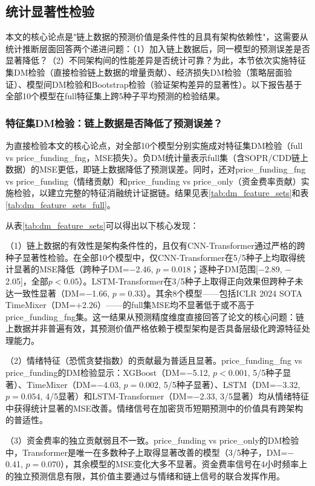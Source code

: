 \documentclass[12pt,a4paper]{ctexart}
\begin{document}
\subsection{统计显著性检验}

本文的核心论点是"链上数据的预测价值是条件性的且具有架构依赖性"，这需要从统计推断层面回答两个递进问题：（1）加入链上数据后，同一模型的预测误差是否显著降低？（2）不同架构间的性能差异是否统计可靠？为此，本节依次实施特征集DM检验（直接检验链上数据的增量贡献）、经济损失DM检验（策略层面验证）、模型间DM检验和Bootstrap检验（验证架构差异的显著性）。以下报告基于全部10个模型在full特征集上跨5种子平均预测的检验结果。

\subsubsection{特征集DM检验：链上数据是否降低了预测误差？}

为直接检验本文的核心论点，对全部10个模型分别实施成对特征集DM检验（full vs price\_funding\_fng，MSE损失）。负DM统计量表示full集（含SOPR/CDD链上数据）的MSE更低，即链上数据降低了预测误差。同时，还对price\_funding\_fng vs price\_funding（情绪贡献）和price\_funding vs price\_only（资金费率贡献）实施检验，以建立完整的特征消融统计证据链。结果见表\ref{tab:dm_feature_sets}和表\ref{tab:dm_feature_sets_full}。



从表\ref{tab:dm_feature_sets}可以得出以下核心发现：

（1）链上数据的有效性是架构条件性的，且仅有CNN-Transformer通过严格的跨种子显著性检验。在全部10个模型中，仅CNN-Transformer在5/5种子上均取得统计显著的MSE降低（跨种子DM=$-$2.46, $p=0.018$；逐种子DM范围[$-$2.89, $-$2.05]，全部$p<0.05$）。LSTM-Transformer在3/5种子上取得正向效果但跨种子未达一致性显著（DM=$-$1.66, $p=0.33$）。其余8个模型——包括ICLR 2024 SOTA TimeMixer（DM=+2.26）——的full集MSE均不显著低于或不高于price\_funding\_fng集。这一结果从预测精度维度直接回答了论文的核心问题：链上数据并非普遍有效，其预测价值严格依赖于模型架构是否具备层级化跨源特征处理能力。

（2）情绪特征（恐慌贪婪指数）的贡献最为普适且显著。price\_funding\_fng vs price\_funding的DM检验显示：XGBoost（DM=$-$5.12, $p<0.001$, 5/5种子显著）、TimeMixer（DM=$-$4.03, $p=0.002$, 5/5种子显著）、LSTM（DM=$-$3.32, $p=0.054$, 4/5显著）和LSTM-Transformer（DM=$-$2.33, 3/5显著）均从情绪特征中获得统计显著的MSE改善。情绪信号在加密货币短期预测中的价值具有跨架构的普适性。

（3）资金费率的独立贡献弱且不一致。price\_funding vs price\_only的DM检验中，Transformer是唯一在多数种子上取得显著改善的模型（3/5种子，DM=$-$0.41, $p=0.070$），其余模型的MSE变化大多不显著。资金费率信号在4小时频率上的独立预测信息有限，其价值主要通过与情绪和链上信号的联合发挥作用。
\end{document}
